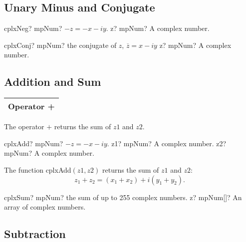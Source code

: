 \subsection{Unary Minus and Conjugate}

\begin{mpFunctionsExtract}
	\mpFunctionOne
	{cplxNeg? mpNum?  $-z=-x-iy$.}
	{z? mpNum? A complex number.}
\end{mpFunctionsExtract}

\vspace{0.6cm}
\begin{mpFunctionsExtract}
	\mpFunctionOne
	{cplxConj? mpNum? the conjugate of $z$, $\overline{z}=x-iy$}
	{z? mpNum? A complex number.}
\end{mpFunctionsExtract}




\subsection{Addition and Sum}

\begin{tabular}{p{481pt}}
	\toprule
	\textsf{Operator \textbf{+}} \\
	\bottomrule
\end{tabular}

\vspace{0.3cm}
The operator $+$ returns the sum of $z1$ and $z2$.

\vspace{0.3cm}
\begin{mpFunctionsExtract}
	\mpFunctionTwo
	{cplxAdd? mpNum?  $-z=-x-iy$.}
	{z1? mpNum? A complex number.}
	{z2? mpNum? A complex number.}
\end{mpFunctionsExtract}

\vspace{0.3cm}
The function \textsf{cplxAdd$(z1, z2)$} returns the sum of $z1$ and $z2$: 
\begin{equation}
	z_1 + z_2 =(x_1 + x_2) + i(y_1 + y_2).
\end{equation}

\vspace{0.6cm}
\begin{mpFunctionsExtract}
	\mpFunctionOne
	{cplxSum? mpNum? the sum of up to 255 complex numbers.}
	{z? mpNum[]? An array of complex numbers.}
\end{mpFunctionsExtract}




\subsection{Subtraction}

